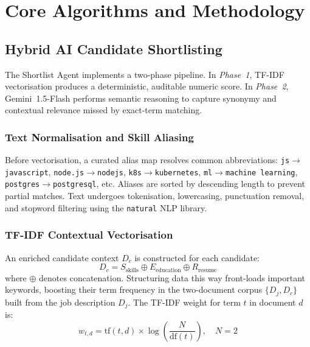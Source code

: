 \documentclass[conference]{IEEEtran}
\begin{document}
\section{Core Algorithms and Methodology}

\subsection{Hybrid AI Candidate Shortlisting}

The Shortlist Agent implements a two-phase pipeline. In \textit{Phase~1}, TF-IDF vectorisation produces a deterministic, auditable numeric score. In \textit{Phase~2}, Gemini~1.5-Flash performs semantic reasoning to capture synonymy and contextual relevance missed by exact-term matching.

\subsubsection{Text Normalisation and Skill Aliasing}
Before vectorisation, a curated alias map resolves common abbreviations: \texttt{js}$\to$\texttt{javascript}, \texttt{node.js}$\to$\texttt{nodejs}, \texttt{k8s}$\to$\texttt{kubernetes}, \texttt{ml}$\to$\texttt{machine learning}, \texttt{postgres}$\to$\texttt{postgresql}, etc. Aliases are sorted by descending length to prevent partial matches. Text undergoes tokenisation, lowercasing, punctuation removal, and stopword filtering using the \texttt{natural} NLP library.

\subsubsection{TF-IDF Contextual Vectorisation}
An enriched candidate context $D_c$ is constructed for each candidate:
\begin{equation}
D_c = S_{\text{skills}} \oplus E_{\text{education}} \oplus R_{\text{resume}}
\end{equation}
where $\oplus$ denotes concatenation. Structuring data this way front-loads important keywords, boosting their term frequency in the two-document corpus $\{D_j, D_c\}$ built from the job description $D_j$. The TF-IDF weight for term $t$ in document $d$ is:
\begin{equation}
w_{t,d} = \mathrm{tf}(t,d) \times \log\!\left(\frac{N}{\mathrm{df}(t)}\right), \quad N{=}2
\end{equation}
\end{document}
